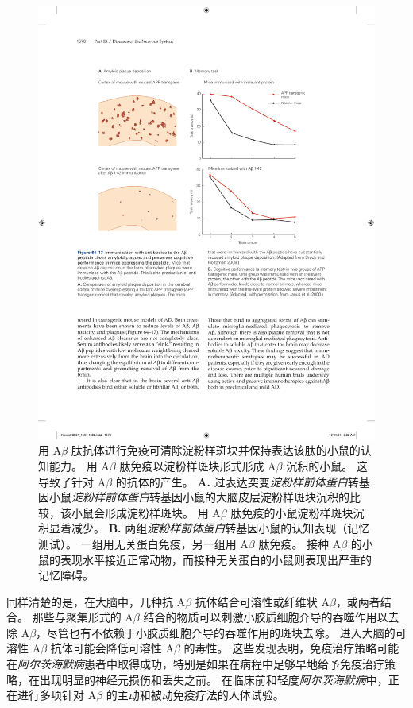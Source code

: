 \begin{figure}[htbp]
	\centering
	\includegraphics[width=0.9\linewidth]{chap64/fig_64_17}
	\caption{用 A$\beta$ 肽抗体进行免疫可清除淀粉样斑块并保持表达该肽的小鼠的认知能力。
		用 A$\beta$ 肽免疫以淀粉样斑块形式形成 A$\beta$ 沉积的小鼠。
		这导致了针对 A$\beta$ 的抗体的产生。
		\textbf{A.} 过表达突变\textit{淀粉样前体蛋白}转基因小鼠\textit{淀粉样前体蛋白}转基因小鼠的大脑皮层淀粉样斑块沉积的比较，该小鼠会形成淀粉样斑块。
		用 A$\beta$ 肽免疫的小鼠淀粉样斑块沉积显着减少\cite{brody2008active}。
		\textbf{B.} 两组\textit{淀粉样前体蛋白}转基因小鼠的认知表现（记忆测试）。
		一组用无关蛋白免疫，另一组用 A$\beta$ 肽免疫。
		接种 A$\beta$ 的小鼠的表现水平接近正常动物，而接种无关蛋白的小鼠则表现出严重的记忆障碍\cite{janus2000abeta}。}
	\label{fig:64_17}
\end{figure}


同样清楚的是，在大脑中，几种抗 A$\beta$ 抗体结合可溶性或纤维状 A$\beta$，或两者结合。
那些与聚集形式的 A$\beta$ 结合的物质可以刺激小胶质细胞介导的吞噬作用以去除 A$\beta$，尽管也有不依赖于小胶质细胞介导的吞噬作用的斑块去除。
进入大脑的可溶性 A$\beta$ 抗体可能会降低可溶性 A$\beta$ 的毒性。
这些发现表明，免疫治疗策略可能在\textit{阿尔茨海默病}患者中取得成功，特别是如果在病程中足够早地给予免疫治疗策略，在出现明显的神经元损伤和丢失之前。
在临床前和轻度\textit{阿尔茨海默病}中，正在进行多项针对 A$\beta$ 的主动和被动免疫疗法的人体试验。



